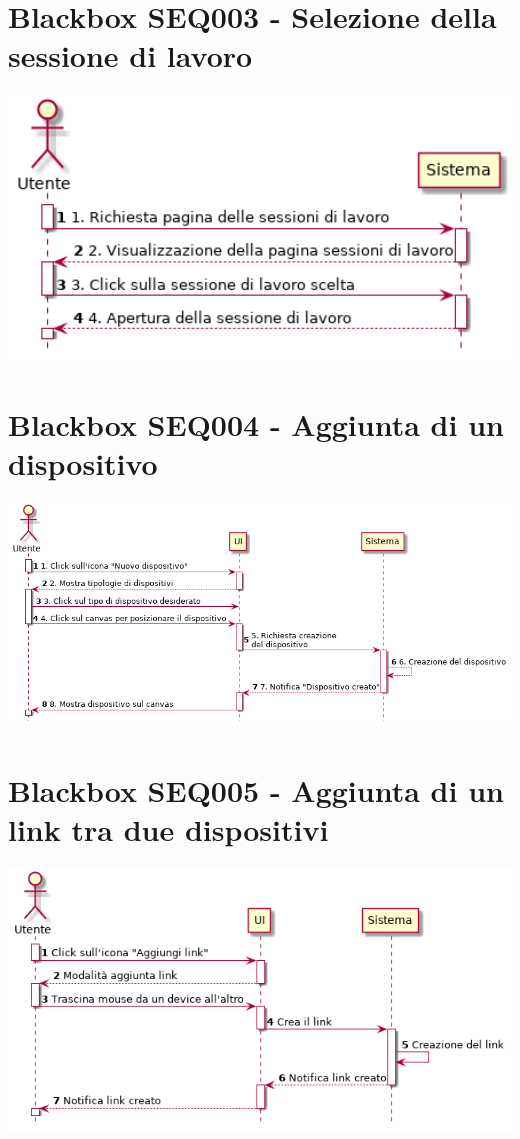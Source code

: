 \documentclass[../main.tex]{subfiles}
\begin{document}
\section{Blackbox SEQ003 - Selezione della sessione di lavoro }
\figure[H]
\centering
\includegraphics[width=15cm]{capitoli/usecases_diagrams/diagrams/SEQ003.png}
\endfigure
\section{Blackbox SEQ004 - Aggiunta di un dispositivo }
\figure[H]
\centering
\includegraphics[width=15cm]{capitoli/usecases_diagrams/diagrams/SEQ004.png}
\endfigure
\section{Blackbox SEQ005 - Aggiunta di un link tra due dispositivi }
\figure[H]
\centering
\includegraphics[width=14cm]{capitoli/usecases_diagrams/diagrams/SEQ005.png}
\endfigure
\end{document}
